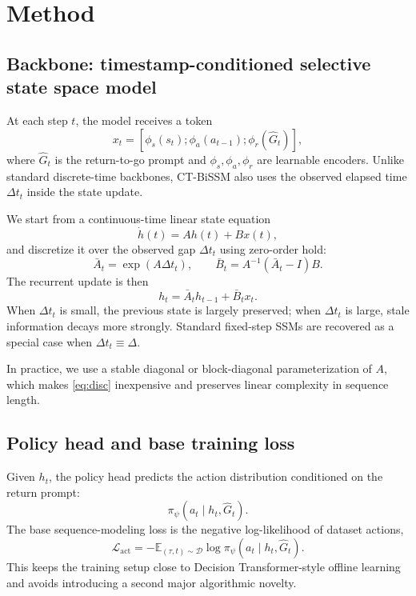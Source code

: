 \documentclass[11pt]{article}
\newcommand{\E}{\mathbb{E}}
\newcommand{\cD}{\mathcal{D}}
\newcommand{\cL}{\mathcal{L}}
\newcommand{\dt}{\Delta t}
\newcommand{\traj}{\tau}
\newcommand{\Rtg}{\widehat{G}}
\begin{document}
\section{Method}

\subsection{Backbone: timestamp-conditioned selective state space model}

At each step $t$, the model receives a token
\[
 x_t = [\phi_s(s_t) ; \phi_a(a_{t-1}) ; \phi_r(\Rtg_t)],
\]
where $\Rtg_t$ is the return-to-go prompt and $\phi_s,\phi_a,\phi_r$ are learnable encoders. Unlike standard discrete-time backbones, CT-BiSSM also uses the observed elapsed time $\dt_t$ inside the state update.

We start from a continuous-time linear state equation
\begin{equation}
\dot{h}(t) = A h(t) + B x(t),
\label{eq:cts}
\end{equation}
and discretize it over the observed gap $\dt_t$ using zero-order hold:
\begin{equation}
\bar A_t = \exp(A\dt_t), \qquad
\bar B_t = A^{-1}(\bar A_t - I)B.
\label{eq:disc}
\end{equation}
The recurrent update is then
\begin{equation}
 h_t = \bar A_t h_{t-1} + \bar B_t x_t.
\label{eq:recurrence}
\end{equation}
When $\dt_t$ is small, the previous state is largely preserved; when $\dt_t$ is large, stale information decays more strongly. Standard fixed-step SSMs are recovered as a special case when $\dt_t \equiv \Delta$.

In practice, we use a stable diagonal or block-diagonal parameterization of $A$, which makes \cref{eq:disc} inexpensive and preserves linear complexity in sequence length.

\subsection{Policy head and base training loss}

Given $h_t$, the policy head predicts the action distribution conditioned on the return prompt:
\begin{equation}
\pi_\psi(a_t \mid h_t, \Rtg_t).
\end{equation}
The base sequence-modeling loss is the negative log-likelihood of dataset actions,
\begin{equation}
\cL_{\mathrm{act}} = -\E_{(\traj, t)\sim \cD} \log \pi_\psi(a_t \mid h_t, \Rtg_t).
\label{eq:actloss}
\end{equation}
This keeps the training setup close to Decision Transformer-style offline learning and avoids introducing a second major algorithmic novelty.
\end{document}

